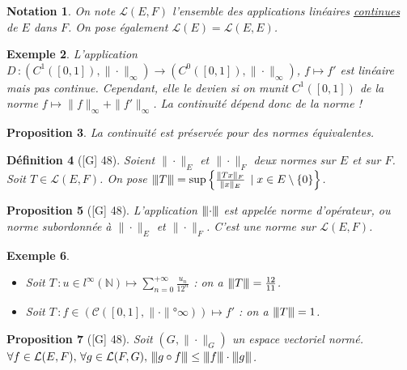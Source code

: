 \documentclass[10pt, a4paper, parskip=full, twoside, twocolumn]{report}
\newtheorem{definition}{Définition}
\newtheorem{proposition}[definition]{Proposition}
\newtheorem{example}[definition]{Exemple}
\newtheorem{notation}[definition]{Notation}
\newcommand{\IN}{\mathbb{N}}
\newcommand{\vertiii}[1]{{\left\vert\kern-0.25ex\left\vert\kern-0.25ex\left\vert #1 
    \right\vert\kern-0.25ex\right\vert\kern-0.25ex\right\vert}}
\begin{document}
\begin{notation}
	On note $\mathcal{L}(E,F)$ l'ensemble des applications linéaires \underline{continues} de $E$ dans $F$.
	On pose également $\mathcal{L}(E)=\mathcal{L}(E,E)$.
\end{notation}

\begin{example}
	L'application $D\,\colon \left(C^1([0,1]),\|\cdot\|_{\infty}\right)\to \left(C^0([0,1]), \|\cdot\|_{\infty}\right)$, $f\mapsto f'$ est 
	linéaire mais pas continue. Cependant, elle le devien si on munit $C^1([0,1])$ de la norme $f\mapsto \|f\|_{\infty} + \|f'\|_{\infty}$. La continuité dépend donc de la norme !
\end{example}

\begin{proposition}
	La continuité est préservée pour des normes équivalentes.
\end{proposition}

\begin{definition}[\textnormal{[G] 48}]
	Soient $\|\cdot\|_E$ et $\|\cdot\|_F$ deux normes sur $E$ et sur $F$. Soit $T\in\mathcal{L}(E,F)$.
	On pose $\vertiii{T} = \sup \left\{\frac{\|Tx\|_F}{\|x\|_E}\,\mid x\in E\setminus \left\{0\right\}\right\}$.
\end{definition}

\begin{proposition}[\textnormal{[G] 48}]
	L'application $\vertiii{\cdot}$ est appelée \emph{norme d'opérateur}, ou \emph{norme subordonnée à $\|\cdot\|_E$ et $\|\cdot\|_F$}. C'est une norme sur $\mathcal{L}(E,F)$. 
\end{proposition}

\begin{example}
	\begin{itemize}
		\item Soit $T\,\colon u\in l^{\infty}(\IN)\mapsto \sum_{n=0}^{+\infty} \frac{u_n}{12^n}$ : on a $\vertiii{T} = \frac{12}{11}$.
		\item Soit $T\,\colon f\in\left(\mathcal{C}([0,1], \|\cdot\|°{\infty})\right) \mapsto f'$ : on a $\vertiii{T} = 1$.
	\end{itemize}
\end{example}

\begin{proposition}[\textnormal{[G] 48}]
	Soit $(G,\|\cdot\|_G)$ un espace vectoriel normé.
	$\forall f\in \mathcal{L}(E,F),\,\forall g\in\mathcal{L}(F,G),\, \vertiii{g\circ f}\leq \vertiii{f}\cdot\vertiii{g}$.
\end{proposition}
\end{document}
